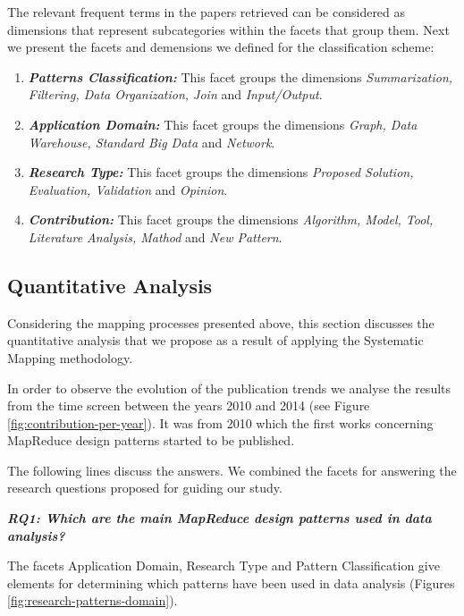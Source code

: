 The relevant frequent terms in the papers retrieved can be considered as
dimensions that represent subcategories within the facets that group them. Next
we present the facets and demensions we defined for the classification scheme: 
 
\begin{enumerate}
\item \textbf{\textit{Patterns Classification:}} This facet groups the
dimensions \textit{Summarization, Filtering, Data Organization, Join} and \textit{Input/Output}.

\item \textbf{\textit{Application Domain:}} This facet groups the dimensions
\textit{Graph, Data Warehouse, Standard Big Data} and \textit{Network}.

\item \textbf{\textit{Research Type:}} This facet groups the dimensions
\textit{Proposed Solution, Evaluation, Validation} and \textit{Opinion}.

\item \textbf{\textit{Contribution:}} This facet groups the dimensions
\textit{Algorithm, Model, Tool, Literature Analysis, Mathod} and \textit{New Pattern}.

\end{enumerate}
 
\subsection{Quantitative Analysis}

Considering the mapping processes presented above, this
section discusses the quantitative analysis that we propose as a result of
applying the Systematic Mapping methodology.  

In order to observe the evolution of the publication trends we analyse the
results from the time screen between the years 2010 and 2014 (see Figure
\ref{fig:contribution-per-year}). It was from 2010 which the first works
concerning MapReduce design patterns started to be published.         

The following lines discuss the answers. We combined the facets for answering
the research questions proposed for guiding our study. 

\bigskip
\textbf{\textit{RQ1: Which are the main MapReduce design patterns used in data
analysis?}} 
    
The facets Application Domain, Research Type and Pattern Classification give
elements for determining which patterns have been used in data analysis (Figures
\ref{fig:research-patterns-domain}). 

